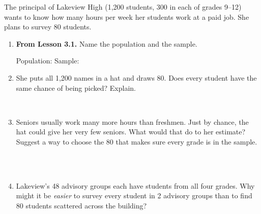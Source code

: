 \documentclass[12pt]{article}
\begin{document}

\vspace{0.22in}

The principal of Lakeview High (1{,}200 students, 300 in each of grades 9--12) wants to know how
many hours per week her students work at a paid job. She plans to survey 80 students.

\vspace{0.16in}

\begin{enumerate}[leftmargin=1.9em, itemsep=0.34in]

  \item \textbf{From Lesson 3.1.} Name the population and the sample.

        \vspace{12pt}
        Population: \blank{4.6cm} \qquad Sample: \blank{4.6cm}

  \item She puts all 1{,}200 names in a hat and draws 80. Does every student have the same
        chance of being picked? Explain.

        \vspace{12pt}
        \writeline\\[18pt]\writeline

  \item Seniors usually work many more hours than freshmen. Just by chance, the hat could give
        her very few seniors. What would that do to her estimate? Suggest a way to choose the 80
        that makes sure every grade is in the sample.

        \vspace{12pt}
        \writeline\\[18pt]\writeline\\[18pt]\writeline

  \item Lakeview's 48 advisory groups each have students from all four grades. Why might it be
        \emph{easier} to survey every student in 2 advisory groups than to find 80 students
        scattered across the building?

        \vspace{12pt}
        \writeline\\[18pt]\writeline

\end{enumerate}
\end{document}
